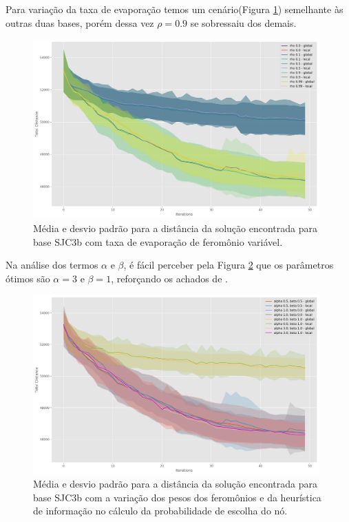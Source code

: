 Para variação da taxa de evaporação temos um cenário(Figura \ref{fig:sjc3b_rho}) semelhante às outras duas bases, porém dessa vez $\rho = 0.9$ se sobressaiu dos demais.

\begin{figure}[h]	
  \centering
  \includegraphics[width=11cm,keepaspectratio]{images/SJC3b_rho.png}
  \caption{Média e desvio padrão para a distância da solução encontrada para base SJC3b com taxa de evaporação de feromônio variável.}
  \label{fig:sjc3b_rho}
\end{figure}

Na análise dos termos $\alpha$ e $\beta$, é fácil perceber pela Figura \ref{fig:sjc3b_alpha_beta} que os parâmetros ótimos são $\alpha = 3$ e $\beta = 1$, reforçando os achados de \cite{de2005max}.

\begin{figure}[h]	
  \centering
  \includegraphics[width=11cm,keepaspectratio]{images/SJC3b_alpha_beta.png}
  \caption{Média e desvio padrão para a distância da solução encontrada para base SJC3b com a variação dos pesos dos feromônios e da heurística de informação no cálculo da probabilidade de escolha do nó.}
  \label{fig:sjc3b_alpha_beta}
\end{figure}

